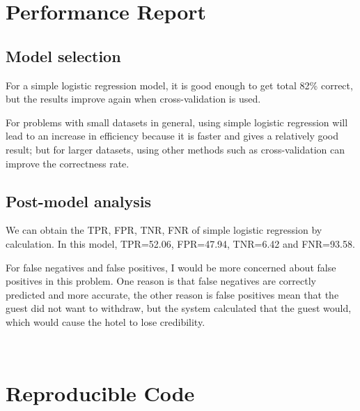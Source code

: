 \documentclass{article}
\begin{document}
\section{Performance Report}

\subsection{Model selection}
For a simple logistic regression model, it is good enough to get total 82\% correct, but the results improve again when cross-validation is used.

For problems with small datasets in general, using simple logistic regression will lead to an increase in efficiency because it is faster and gives a relatively good result; but for larger datasets, using other methods such as cross-validation can improve the correctness rate.

\subsection{Post-model analysis}
We can obtain the TPR, FPR, TNR, FNR of simple logistic regression by calculation. In this model, TPR=52.06, FPR=47.94, TNR=6.42 and FNR=93.58.

For false negatives and false positives, I would be more concerned about false positives in this problem. One reason is that false negatives are correctly predicted and more accurate, the other reason is false positives mean that the guest did not want to withdraw, but the system calculated that the guest would, which would cause the hotel to lose credibility.


\ 

\section{Reproducible Code}
\end{document}
